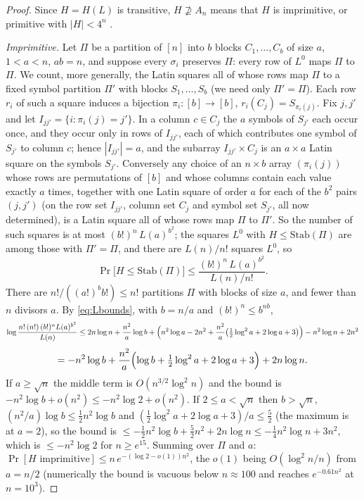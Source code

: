\begin{proof}
Since $H=H(L)$ is transitive, $H\not\supseteq A_n$ means that $H$ is
imprimitive, or primitive with $|H|<4^n$ \cite{PS80}.

\emph{Imprimitive.}  Let $\Pi$ be a partition of $[n]$ into $b$ blocks
$C_1,\dots,C_b$ of size $a$, $1<a<n$, $ab=n$, and suppose every
$\sigma_i$ preserves $\Pi$: every row of $L^0$ maps $\Pi$ to $\Pi$.  We
count, more generally, the Latin squares all of whose rows map $\Pi$ to
a fixed symbol partition $\Pi'$ with blocks $S_1,\dots,S_b$ (we need
only $\Pi'=\Pi$).  Each row $r_i$ of such a square induces a bijection
$\pi_i\colon[b]\to[b]$, $r_i(C_j)=S_{\pi_i(j)}$.  Fix $j,j'$ and let
$I_{jj'}=\{i:\pi_i(j)=j'\}$.  In a column $c\in C_j$ the $a$ symbols
of $S_{j'}$ each occur once, and they occur only in rows of
$I_{jj'}$, each of which contributes one symbol of $S_{j'}$ to column
$c$; hence $|I_{jj'}|=a$, and the subarray $I_{jj'}\times C_j$ is an
$a\times a$ Latin square on the symbols $S_{j'}$.  Conversely any
choice of an $n\times b$ array $(\pi_i(j))$ whose rows are permutations
of $[b]$ and whose columns contain each value exactly $a$ times,
together with one Latin square of order $a$ for each of the $b^2$
pairs $(j,j')$ (on the row set $I_{jj'}$, column set $C_j$ and symbol
set $S_{j'}$, all now determined), is a Latin square all of whose rows
map $\Pi$ to $\Pi'$.  So the number of such squares is at most
$(b!)^n\,L(a)^{b^2}$; the squares $L^0$ with $H\le\mathrm{Stab}(\Pi)$
are among those with $\Pi'=\Pi$, and there are $L(n)/n!$ squares
$L^0$, so
\[
\Pr\bigl[H\le\mathrm{Stab}(\Pi)\bigr]
\le\frac{(b!)^n\,L(a)^{b^2}}{L(n)/n!}.
\]
There are $n!/((a!)^bb!)\le n!$ partitions $\Pi$ with blocks of size
$a$, and fewer than $n$ divisors $a$.  By \eqref{eq:Lbounds}, with
$b=n/a$ and $(b!)^n\le b^{nb}$,
\[
\log\frac{n!\,(n!)\,(b!)^nL(a)^{b^2}}{L(n)}
\le 2n\log n+\frac{n^2}{a}\log b+\Bigl(n^2\log a-2n^2+\frac{n^2}{a}\bigl(\tfrac12\log^2a+2\log a+3\bigr)\Bigr)-n^2\log n+2n^2
\]
\[
=-n^2\log b+\frac{n^2}{a}\Bigl(\log b+\tfrac12\log^2a+2\log a+3\Bigr)+2n\log n .
\]
If $a\ge\sqrt n$ the middle term is $O(n^{3/2}\log^2n)$ and the bound
is $-n^2\log b+o(n^2)\le-n^2\log2+o(n^2)$.  If $2\le a<\sqrt n$ then
$b>\sqrt n$, $(n^2/a)\log b\le\tfrac12n^2\log b$ and
$(\tfrac12\log^2a+2\log a+3)/a\le\tfrac52$ (the maximum is at $a=2$), so the
bound is $\le-\tfrac12n^2\log b+\tfrac52n^2+2n\log n\le-\tfrac14n^2\log n+3n^2$,
which is $\le-n^2\log2$ for $n\ge e^{15}$.  Summing over $\Pi$ and
$a$: $\Pr[H\text{ imprimitive}]\le n\,e^{-(\log2-o(1))n^2}$, the
$o(1)$ being $O(\log^2n/n)$ from $a=n/2$ (numerically the bound is
vacuous below $n\approx100$ and reaches $e^{-0.61n^2}$ at $n=10^3$).


\end{proof}
